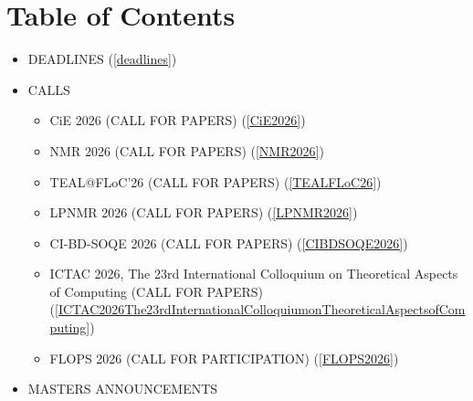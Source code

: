 \documentclass[prodmode,acmtecs]{acmsmall} %
\begin{document}
\section{Table of Contents}\begin{itemize}\item DEADLINES (\cref{deadlines}) 
 
\item CALLS 
 
\begin{itemize}\item CiE 2026 (CALL FOR PAPERS) (\cref{CiE2026})
\item NMR 2026 (CALL FOR PAPERS) (\cref{NMR2026})
\item TEAL@FLoC'26 (CALL FOR PAPERS) (\cref{TEALFLoC26})
\item LPNMR 2026 (CALL FOR PAPERS) (\cref{LPNMR2026})
\item CI-BD-SOQE 2026 (CALL FOR PAPERS) (\cref{CIBDSOQE2026})
\item ICTAC 2026, The 23rd International Colloquium on Theoretical Aspects of Computing (CALL FOR PAPERS) (\cref{ICTAC2026The23rdInternationalColloquiumonTheoreticalAspectsofComputing})
\item FLOPS 2026 (CALL FOR PARTICIPATION) (\cref{FLOPS2026})
\end{itemize} 
\item MASTERS ANNOUNCEMENTS 
 

\end{itemize}
\end{document}
